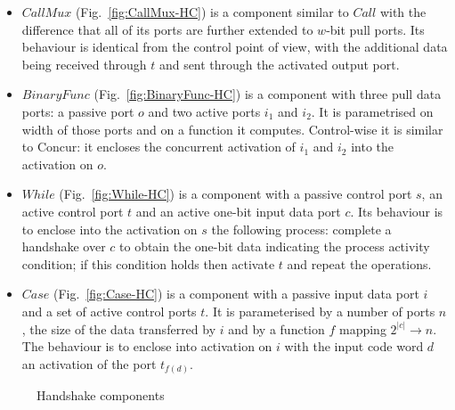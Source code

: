 \begin{itemize}
\item
$CallMux$ (Fig.~\ref{fig:CallMux-HC}) is a component similar to $Call$ with the difference that all of its ports are further extended to $w$-bit pull ports.
Its behaviour is identical from the control point of view, with the additional data being received through $t$ and sent through the activated output port.

\item
$BinaryFunc$ (Fig.~\ref{fig:BinaryFunc-HC}) is a component with three pull data ports: a passive port $o$ and two active ports $i_1$ and $i_2$. It is parametrised on width of those ports and on a function it computes. Control-wise it is similar to Concur: it encloses the concurrent activation of $i_1$ and $i_2$ into the activation on $o$.

\item
$While$ (Fig.~\ref{fig:While-HC}) is a component with a passive control port $s$, an active control port $t$ and an active one-bit input data port $c$. Its behaviour is to enclose into the activation on $s$ the following process:
complete a handshake over $c$ to obtain the one-bit data indicating the process activity condition; if this condition holds then activate $t$ and repeat the operations.

\item
$Case$ (Fig.~\ref{fig:Case-HC}) is a component with a passive input data port $i$ and a set of active control ports $t$. It is parameterised by a number of ports $n$, 
the size of the data transferred by $i$ and by a function $f$ mapping $2^{|c|}\rightarrow n$.
The behaviour is to enclose into activation on $i$ with the input code word $d$ an activation of the port $t_{f(d)}$.

\end{itemize}



\begin{figure}
\centering
{} {}
 {}
 {}
 {}

 {}
 {}
 {}
 {}

\caption{Handshake components}
\end{figure}

